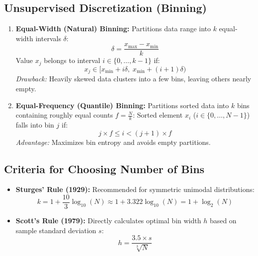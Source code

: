 \subsection{Unsupervised Discretization (Binning)}
\begin{enumerate}
    \item \textbf{Equal-Width (Natural) Binning:}
    Partitions data range into $k$ equal-width intervals $\delta$:
    \begin{equation}
    \delta = \frac{x_{\max} - x_{\min}}{k}
    \end{equation}
    Value $x_j$ belongs to interval $i \in \{0, \dots, k-1\}$ if:
    \begin{equation}
    x_j \in [x_{\min} + i\delta, \; x_{\min} + (i+1)\delta)
    \end{equation}
    \textit{Drawback:} Heavily skewed data clusters into a few bins, leaving others nearly empty.

    \item \textbf{Equal-Frequency (Quantile) Binning:}
    Partitions sorted data into $k$ bins containing roughly equal counts $f = \frac{N}{k}$:
    Sorted element $x_i$ ($i \in \{0, \dots, N-1\}$) falls into bin $j$ if:
    \begin{equation}
    j \times f \le i < (j+1) \times f
    \end{equation}
    \textit{Advantage:} Maximizes bin entropy and avoids empty partitions.
\end{enumerate}

\subsection{Criteria for Choosing Number of Bins}
\begin{itemize}
    \item \textbf{Sturges' Rule (1929):} Recommended for symmetric unimodal distributions:
    \begin{equation}
    k = 1 + \frac{10}{3} \log_{10}(N) \approx 1 + 3.322 \log_{10}(N) = 1 + \log_2(N)
    \end{equation}
    \item \textbf{Scott's Rule (1979):} Directly calculates optimal bin width $h$ based on sample standard deviation $s$:
    \begin{equation}
    h = \frac{3.5 \times s}{\sqrt[3]{N}}
    \end{equation}
\end{itemize}

